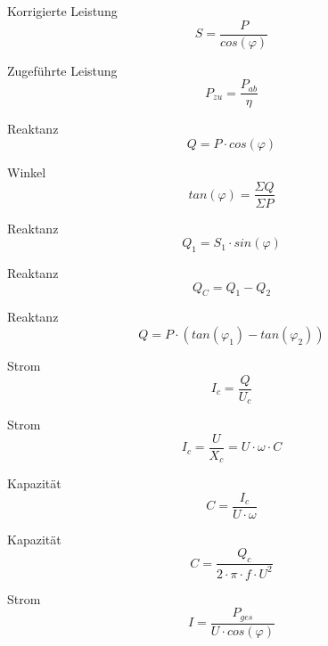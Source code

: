 \documentclass[11pt, a4paper, draft, fleqn, twocolumn]{article}
\numberwithin{equation}{subsection}
\begin{document}
Korrigierte Leistung
\begin{equation}
    S = \frac{P}{cos(\varphi)}
\end{equation}

\noindent Zugeführte Leistung
\begin{equation}
    P_{zu} = \frac{P_{ab}}{\eta}
\end{equation}

\noindent Reaktanz
\begin{equation}
    Q = P \cdot cos(\varphi)
\end{equation}

\noindent Winkel
\begin{equation}
    tan(\varphi) = \frac{\Sigma Q}{\Sigma P}
\end{equation}

\noindent Reaktanz
\begin{equation}
    Q_1 = S_1 \cdot sin(\varphi)
\end{equation}

\noindent Reaktanz
\begin{equation}
    Q_C = Q_1 - Q_2
\end{equation}

\noindent Reaktanz
\begin{equation}
    Q = P \cdot (tan(\varphi_1) - tan(\varphi_2))
\end{equation}

\noindent Strom
\begin{equation}
    I_c = \frac{Q}{U_c}
\end{equation}

\noindent Strom
\begin{equation}
    I_c = \frac{U}{X_c} = U \cdot \omega \cdot C
\end{equation}

\noindent Kapazität
\begin{equation}
    C = \frac{I_c}{U \cdot \omega}
\end{equation}

\noindent Kapazität
\begin{equation}
    C = \frac{Q_c}{2 \cdot \pi \cdot f \cdot U^2}
\end{equation}

\noindent Strom
\begin{equation}
    I = \frac{P_{ges}}{U \cdot cos(\varphi)}
\end{equation}
\end{document}
